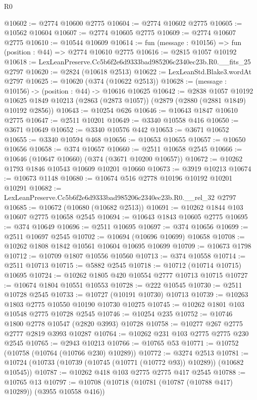 \begin{lexlean}{R0}
\begin{coremodule}
@10602 := @2774 @10600 @2775
@10604 := @2774 @10602 @2775
@10605 := @10562 @10604
@10607 := @2774 @10605 @2775
@10609 := @2774 @10607 @2775
@10610 := @10544 @10609
@10614 := fun (message : @10156) => fun (position : @44) => @2774 @10610 @2775
@10616 := @2815 @1057 @10192
@10618 := LexLeanPreserve.Cc5b6f2e6d9333bad985206c2340ec23b.R0.__fits_25 @2797
@10620 := @2824 (@10618 @2513)
@10622 := LexLeanStd.Blake3.wordAt @2797
@10625 := @10620 (@374 (@10622 @2513))
@10628 := (message : @10156) -> (position : @44) -> @10616 @10625
@10642 := @2838
    @1057
    @10192
    @10625
    @1849
    @10213
    (@2863 (@2873 @1057))
    (@2879 (@2880 (@2881 @1849) @10192 @2856))
@10643 := @10254 @626
@10646 := @10643 @1847 @10610 @2775
@10647 := @2511 @10201
@10649 := @3340 @10558 @416
@10650 := @3671 @10649
@10652 := @3340 @10576 @442
@10653 := @3671 @10652
@10655 := @3340 @10594 @468
@10656 := @10653 @10655
@10657 := @10650 @10656
@10658 := @374 @10657
@10660 := @2511 @10658 @2545
@10666 := @10646 (@10647 @10660) (@374 (@3671 @10200 @10657))
@10672 := @10262 @1793 @1846 @10543 @10609 @10201 @10660
@10673 := @3919 @10213
@10674 := @10673 @1148
@10680 := @10674 @516 @2778 @10196 @10192 @10201 @10291
@10682 := LexLeanPreserve.Cc5b6f2e6d9333bad985206c2340ec23b.R0.__rel_32 @2797
@10685 := @10672 (@10680 (@10682 @2513))
@10691 := @10262 @1844 @103 @10607 @2775 @10658 @2545
@10694 := @10643 @1843 @10605 @2775
@10695 := @374 @10649
@10696 := @2511 @10695
@10697 := @374 @10656
@10699 := @2511 @10697 @2545
@10702 := @10694 (@10696 @10699) @10658
@10708 := @10262 @1808 @1842 @10561 @10604 @10695 @10699
@10709 := @10673 @1798
@10712 := @10709 @1807 @10556 @10560
@10713 := @374 @10558
@10714 := @2511 @10713
@10715 := @5882 @2545
@10718 := @10712 (@10714 @10715) @10695
@10724 := @10262 @1805 @420 @10554 @2777 @10713 @10715
@10727 := @10674 @1804 @10551 @10553
@10728 := @222 @10545
@10730 := @2511 @10728 @2545
@10733 := @10727 (@10191 @10730) @10713
@10739 := @10263 @1803 @2775 @10550 @10190 @10730 @10275
@10745 := @10262 @1801 @103 @10548 @2775 @10728 @2545
@10746 := @10254 @235
@10752 := @10746 @1800 @2778 @10547 (@2820 @3993) @10728
@10758 := @10277 @267 @2775 @2777 @2819 @3993 @10287
@10764 := @10262 @231 @103 @2775 @2775 @230 @2545
@10765 := @2943 @10213
@10766 := @10765 @53
@10771 := @10752 (@10758 (@10764 (@10766 @230) @10289))
@10772 := @3274 @2513
@10781 := @10724 (@10733 (@10739 (@10745 (@10771 (@10772 @93)) @10289)) (@10682 @10545))
@10787 := @10262 @418 @103 @2775 @2775 @417 @2545
@10788 := @10765 @13
@10797 := @10708 (@10718 (@10781 (@10787 (@10788 @417) @10289)) (@3955 @10558 @416))

\end{coremodule}
\end{lexlean}
